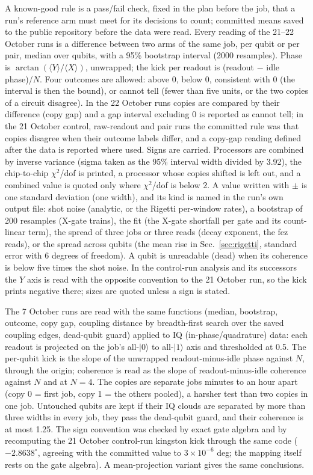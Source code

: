 \documentclass[reprint,amsmath,amssymb,aps,superscriptaddress,nofootinbib]{revtex4-2}
\begin{document}
A known-good rule is a pass/fail check, fixed in the plan before the job, that a run's reference arm must meet for its decisions to count; committed means saved to the public repository before the data were read. Every reading of the 21--22 October runs is a difference between two arms of the same job, per qubit or per pair, median over qubits, with a 95\% bootstrap interval (2000 resamples). Phase is $\arctan(\langle Y\rangle/\langle X\rangle)$, unwrapped; the kick per readout is (readout $-$ idle phase)/$N$. Four outcomes are allowed: above 0, below 0, consistent with 0 (the interval is then the bound), or cannot tell (fewer than five units, or the two copies of a circuit disagree). In the 22 October runs copies are compared by their difference (copy gap) and a gap interval excluding 0 is reported as cannot tell; in the 21 October control, raw-readout and pair runs the committed rule was that copies disagree when their outcome labels differ, and a copy-gap reading defined after the data is reported where used. Signs are carried. Processors are combined by inverse variance (sigma taken as the 95\% interval width divided by 3.92), the chip-to-chip $\chi^2$/dof is printed, a processor whose copies shifted is left out, and a combined value is quoted only where $\chi^2$/dof is below 2. A value written with $\pm$ is one standard deviation (one width), and its kind is named in the run's own output file: shot noise (analytic, or the Rigetti per-window rates), a bootstrap of 200 resamples (X-gate trains), the fit (the X-gate shortfall per gate and its count-linear term), the spread of three jobs or three reads (decay exponent, the fez reads), or the spread across qubits (the mean rise in Sec.~\ref{sec:rigetti}, standard error with 6 degrees of freedom). A qubit is unreadable (dead) when its coherence is below five times the shot noise. In the control-run analysis and its successors the $Y$ axis is read with the opposite convention to the 21 October run, so the kick prints negative there; sizes are quoted unless a sign is stated.

The 7 October runs are read with the same functions (median, bootstrap, outcome, copy gap, coupling distance by breadth-first search over the saved coupling edges, dead-qubit guard) applied to IQ (in-phase/quadrature) data: each readout is projected on the job's all-$|0\rangle$ to all-$|1\rangle$ axis and thresholded at 0.5. The per-qubit kick is the slope of the unwrapped readout-minus-idle phase against $N$, through the origin; coherence is read as the slope of readout-minus-idle coherence against $N$ and at $N=4$. The copies are separate jobs minutes to an hour apart (copy 0 = first job, copy 1 = the others pooled), a harsher test than two copies in one job. Untouched qubits are kept if their IQ clouds are separated by more than three widths in every job, they pass the dead-qubit guard, and their coherence is at most 1.25. The sign convention was checked by exact gate algebra and by recomputing the 21 October control-run kingston kick through the same code ($-2.8638^\circ$, agreeing with the committed value to $3\times10^{-6}$ deg; the mapping itself rests on the gate algebra). A mean-projection variant gives the same conclusions.
\end{document}
